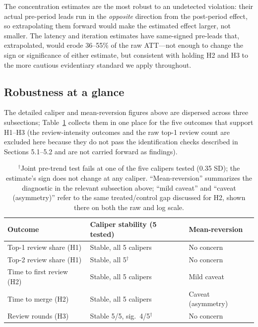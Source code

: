 \documentclass[12pt]{article}
\begin{document}
The concentration estimates are the most robust to an undetected
violation: their actual pre-period leads run in the \emph{opposite}
direction from the post-period effect, so extrapolating them forward
would make the estimated effect larger, not smaller. The latency and
iteration estimates have same-signed pre-leads that, extrapolated, would
erode 36--55\% of the raw ATT---not enough to change the sign or
significance of either estimate, but consistent with holding H2 and H3 to
the more cautious evidentiary standard we apply throughout.

\subsection{Robustness at a glance}

The detailed caliper and mean-reversion figures above are dispersed
across three subsections; Table~\ref{tab:robustness} collects them in one
place for the five outcomes that support H1--H3 (the review-intensity
outcomes and the raw top-1 review count are excluded here because they do
not pass the identification checks described in Sections 5.1--5.2 and are
not carried forward as findings).

\begin{table}[htbp]
\centering
\caption{Robustness summary for the outcomes supporting H1--H3}
\label{tab:robustness}
\small
\begin{tabular}{lll}
\toprule
Outcome & Caliper stability (5 tested) & Mean-reversion \\
\midrule
Top-1 review share (H1)   & Stable, all 5 calipers        & No concern \\
Top-2 review share (H1)   & Stable, all 5$^{\dagger}$      & No concern \\
Time to first review (H2) & Stable, all 5 calipers        & Mild caveat \\
Time to merge (H2)        & Stable, all 5 calipers        & Caveat (asymmetry) \\
Review rounds (H3)        & Stable 5/5, sig.\ 4/5$^{\dagger}$ & No concern \\
\bottomrule
\end{tabular}
\caption*{\footnotesize $^{\dagger}$Joint pre-trend test fails at one of
the five calipers tested (0.35 SD); the estimate's sign does not change at
any caliper. ``Mean-reversion'' summarizes the diagnostic in the relevant
subsection above; ``mild caveat'' and ``caveat (asymmetry)'' refer to the
same treated/control gap discussed for H2, shown there on both the raw
and log scale.}
\end{table}
\end{document}
